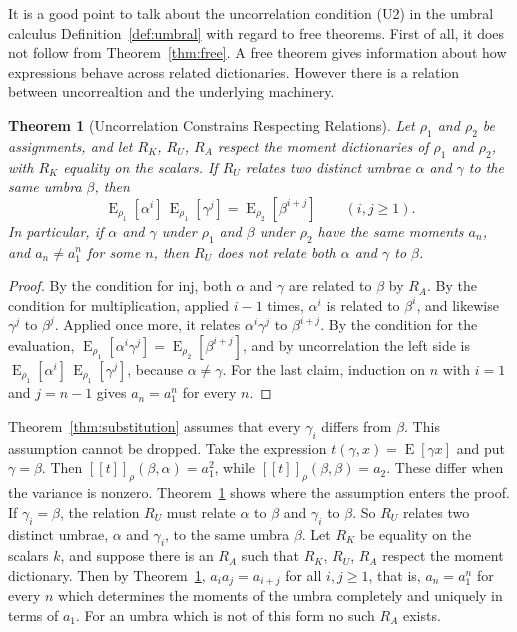 \documentclass[11pt,a4paper]{report}
\theoremstyle{plain}
\newtheorem{theorem}{Theorem}[chapter]
\theoremstyle{definition}
\theoremstyle{remark}
\newcommand{\E}{\operatorname{E}}
\newcommand{\den}[2]{[\![#1]\!]_{#2}}
\begin{document}
It is a good point to talk about the uncorrelation condition (U2) in the umbral calculus
Definition~\ref{def:umbral} with regard to free theorems. First of all, it does not follow from
Theorem~\ref{thm:free}. A free theorem gives information about how expressions behave across
related dictionaries. However there is a relation between uncorrealtion and the underlying machinery.

\begin{theorem}[Uncorrelation Constrains Respecting Relations]
\label{thm:uncorrelation}
Let $\rho_1$ and $\rho_2$ be assignments, and let $R_K$, $R_U$, $R_A$ respect the
moment dictionaries of $\rho_1$ and $\rho_2$, with $R_K$ equality on the
scalars. If $R_U$
relates two distinct umbrae $\alpha$ and $\gamma$ to the same umbra $\beta$, then
\[
  \E_{\rho_1}[\alpha^i]\,\E_{\rho_1}[\gamma^j] = \E_{\rho_2}[\beta^{i+j}]
  \qquad (i, j \geq 1) .
\]
In particular, if $\alpha$ and $\gamma$ under $\rho_1$ and $\beta$ under $\rho_2$
have the same moments $a_n$, and $a_n \neq a_1^n$ for some $n$, then $R_U$ does not relate
both $\alpha$ and $\gamma$ to $\beta$.
\end{theorem}

\begin{proof}
By the condition for $\mathrm{inj}$, both $\alpha$ and $\gamma$ are related to
$\beta$ by $R_A$. By the condition for multiplication, applied $i - 1$
times, $\alpha^i$ is related to $\beta^i$, and likewise $\gamma^j$ to $\beta^j$.
Applied once more, it relates $\alpha^i\gamma^j$ to $\beta^{i+j}$. By the condition for the
evaluation, $\E_{\rho_1}[\alpha^i\gamma^j] = \E_{\rho_2}[\beta^{i+j}]$, and by
uncorrelation the left side is $\E_{\rho_1}[\alpha^i]\,\E_{\rho_1}[\gamma^j]$,
because $\alpha \neq \gamma$. For the last claim, induction on $n$ with $i = 1$
and $j = n - 1$ gives $a_n = a_1^n$ for every $n$.
\end{proof}

Theorem~\ref{thm:substitution} assumes that every $\gamma_i$ differs from
$\beta$. This assumption cannot be dropped. Take the expression 
$t(\gamma, x) = \E[\gamma x]$ and put
$\gamma = \beta$. Then $\den{t}{\rho}(\beta, \alpha) = a_1^2$, while
$\den{t}{\rho}(\beta, \beta) = a_2$. These differ when the variance is nonzero.
Theorem~\ref{thm:uncorrelation} shows where the assumption enters the proof. If
$\gamma_i = \beta$, the relation $R_U$ must relate $\alpha$ to $\beta$ and
$\gamma_i$ to $\beta$. So $R_U$ relates two distinct umbrae, $\alpha$ and
$\gamma_i$, to the same umbra $\beta$. Let $R_K$ be equality on the scalars $k$,
and suppose there is an $R_A$ such that $R_K$, $R_U$, $R_A$ respect the moment
dictionary. Then by Theorem~\ref{thm:uncorrelation}, $a_i a_j = a_{i+j}$ for all
$i, j \geq 1$, that is, $a_n = a_1^n$ for every $n$ which determines the moments
of the umbra completely and uniquely in terms of $a_1$. For an umbra
which is not of this form no such $R_A$ exists.
\end{document}

